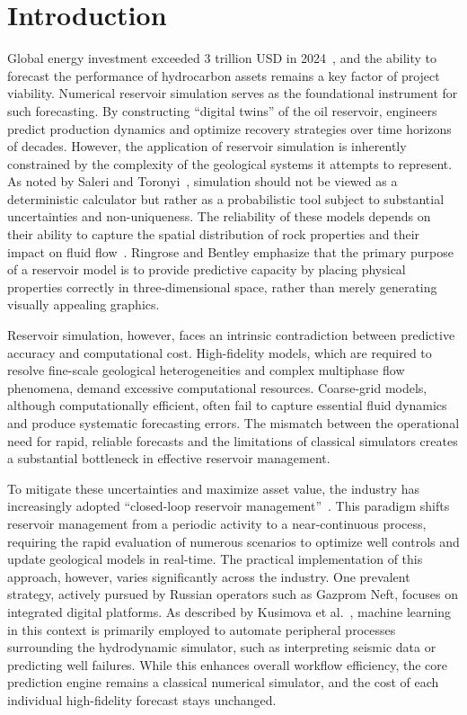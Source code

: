 \chapter{Introduction}
\label{chap:intro}

Global energy investment exceeded 3 trillion USD in 2024~\cite{iea_investment_2024}, and the ability to forecast the performance of hydrocarbon assets remains a key factor of project viability. Numerical reservoir simulation serves as the foundational instrument for such forecasting. By constructing \enquote{digital twins} of the oil reservoir, engineers predict production dynamics and optimize recovery strategies over time horizons of decades. However, the application of reservoir simulation is inherently constrained by the complexity of the geological systems it attempts to represent. As noted by Saleri and Toronyi~\cite{spe_recovery_economics}, simulation should not be viewed as a deterministic calculator but rather as a probabilistic tool subject to substantial uncertainties and non-uniqueness. The reliability of these models depends on their ability to capture the spatial distribution of rock properties and their impact on fluid flow~\cite{ringrose_value_2013}. Ringrose and Bentley emphasize that the primary purpose of a reservoir model is to provide predictive capacity by placing physical properties correctly in three-dimensional space, rather than merely generating visually appealing graphics.

Reservoir simulation, however, faces an intrinsic contradiction between predictive accuracy and computational cost. High-fidelity models, which are required to resolve fine-scale geological heterogeneities and complex multiphase flow phenomena, demand excessive computational resources. Coarse-grid models, although computationally efficient, often fail to capture essential fluid dynamics and produce systematic forecasting errors. The mismatch between the operational need for rapid, reliable forecasts and the limitations of classical simulators creates a substantial bottleneck in effective reservoir management.

To mitigate these uncertainties and maximize asset value, the industry has increasingly adopted \enquote{closed-loop reservoir management}~\cite{jansen_closed_loop_2009}. This paradigm shifts reservoir management from a periodic activity to a near-continuous process, requiring the rapid evaluation of numerous scenarios to optimize well controls and update geological models in real-time. The practical implementation of this approach, however, varies significantly across the industry. One prevalent strategy, actively pursued by Russian operators such as Gazprom Neft, focuses on integrated digital platforms. As described by Kusimova et al.~\cite{gazpromneft_ml_conference}, machine learning in this context is primarily employed to automate peripheral processes surrounding the hydrodynamic simulator, such as interpreting seismic data or predicting well failures. While this enhances overall workflow efficiency, the core prediction engine remains a classical numerical simulator, and the cost of each individual high-fidelity forecast stays unchanged.

